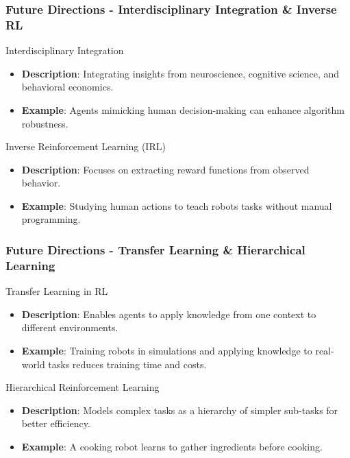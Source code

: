\documentclass[aspectratio=169]{beamer}
\begin{document}
\begin{frame}[fragile]
    \frametitle{Future Directions - Interdisciplinary Integration & Inverse RL}
    \begin{block}{Interdisciplinary Integration}
        \begin{itemize}
            \item \textbf{Description}: Integrating insights from neuroscience, cognitive science, and behavioral economics.
            \item \textbf{Example}: Agents mimicking human decision-making can enhance algorithm robustness.
        \end{itemize}
    \end{block}
    
    \begin{block}{Inverse Reinforcement Learning (IRL)}
        \begin{itemize}
            \item \textbf{Description}: Focuses on extracting reward functions from observed behavior.
            \item \textbf{Example}: Studying human actions to teach robots tasks without manual programming.
        \end{itemize}
    \end{block}
\end{frame}

\begin{frame}[fragile]
    \frametitle{Future Directions - Transfer Learning & Hierarchical Learning}
    \begin{block}{Transfer Learning in RL}
        \begin{itemize}
            \item \textbf{Description}: Enables agents to apply knowledge from one context to different environments.
            \item \textbf{Example}: Training robots in simulations and applying knowledge to real-world tasks reduces training time and costs.
        \end{itemize}
    \end{block}
    
    \begin{block}{Hierarchical Reinforcement Learning}
        \begin{itemize}
            \item \textbf{Description}: Models complex tasks as a hierarchy of simpler sub-tasks for better efficiency.
            \item \textbf{Example}: A cooking robot learns to gather ingredients before cooking.
        \end{itemize}
    \end{block}
\end{frame}
\end{document}
